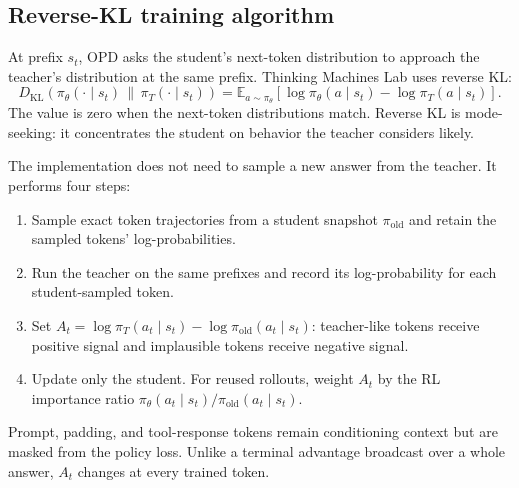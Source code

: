 \subsection{Reverse-KL training algorithm}

At prefix $s_t$, OPD asks the student's next-token distribution to approach the teacher's
distribution at the same prefix. Thinking Machines Lab uses reverse KL:
\begin{equation}
  D_{\mathrm{KL}}\!\left(\pi_\theta(\cdot\mid s_t)
  \,\|\,\pi_T(\cdot\mid s_t)\right)
  =\mathbb{E}_{a\sim\pi_\theta}
  \left[\log\pi_\theta(a\mid s_t)-\log\pi_T(a\mid s_t)\right].
  \label{eq:opd-reverse-kl}
\end{equation}
The value is zero when the next-token distributions match. Reverse KL is mode-seeking: it
concentrates the student on behavior the teacher considers likely.

The implementation does not need to sample a new answer from the teacher. It performs four
steps:
\begin{enumerate}
  \item Sample exact token trajectories from a student snapshot $\pi_{\mathrm{old}}$ and
        retain the sampled tokens' log-probabilities.
  \item Run the teacher on the same prefixes and record its log-probability for each
        student-sampled token.
  \item Set $A_t=\log\pi_T(a_t\mid s_t)-\log\pi_{\mathrm{old}}(a_t\mid s_t)$: teacher-like
        tokens receive positive signal and implausible tokens receive negative signal.
  \item Update only the student. For reused rollouts, weight $A_t$ by the RL importance
        ratio $\pi_\theta(a_t\mid s_t)/\pi_{\mathrm{old}}(a_t\mid s_t)$.
\end{enumerate}
Prompt, padding, and tool-response tokens remain conditioning context but are masked from
the policy loss. Unlike a terminal advantage broadcast over a whole answer, $A_t$ changes
at every trained token.
